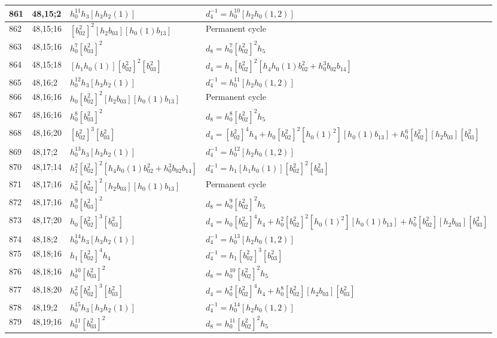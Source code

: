 \documentclass{article}
\begin{document}
\begin{longtable}{|l|l|>{\raggedright\arraybackslash}p{6cm}|>{\raggedright\arraybackslash}p{6cm}|}
\hline
861 & 48,15;2 & $h_0^{11}h_3[h_3h_2(1)]$ & $d_{4}^{-1}=h_0^{10}[h_2h_0(1, 2)]$\\
\hline
862 & 48,15;16 & $[b_{02}^2]^2[h_2b_{03}][h_0(1)b_{13}]$ & Permanent cycle\\
863 & 48,15;16 & $h_0^7[b_{03}^2]^2$ &$d_{8}=h_0^7[b_{02}^2]^2h_5$\\
\hline
864 & 48,15;18 & $[h_1h_0(1)][b_{02}^2]^2[b_{03}^2]$ &$d_{4}=h_1[b_{02}^2]^2[h_4h_0(1)b_{02}^2 + h_0^3b_{02}b_{14}]$\\
\hline
865 & 48,16;2 & $h_0^{12}h_3[h_3h_2(1)]$ & $d_{4}^{-1}=h_0^{11}[h_2h_0(1, 2)]$\\
\hline
866 & 48,16;16 & $h_0[b_{02}^2]^2[h_2b_{03}][h_0(1)b_{13}]$ & Permanent cycle\\
867 & 48,16;16 & $h_0^8[b_{03}^2]^2$ &$d_{8}=h_0^8[b_{02}^2]^2h_5$\\
\hline
868 & 48,16;20 & $[b_{02}^2]^3[b_{03}^2]$ &$d_{4}=[b_{02}^2]^4h_4 + h_0[b_{02}^2]^2[h_0(1)^2][h_0(1)b_{13}] + h_0^6[b_{02}^2][h_2b_{03}][b_{03}^2]$\\
\hline
869 & 48,17;2 & $h_0^{13}h_3[h_3h_2(1)]$ & $d_{4}^{-1}=h_0^{12}[h_2h_0(1, 2)]$\\
\hline
870 & 48,17;14 & $h_1^2[b_{02}^2]^2[h_4h_0(1)b_{02}^2 + h_0^3b_{02}b_{14}]$ & $d_{4}^{-1}=h_1[h_1h_0(1)][b_{02}^2]^2[b_{03}^2]$\\
\hline
871 & 48,17;16 & $h_0^2[b_{02}^2]^2[h_2b_{03}][h_0(1)b_{13}]$ & Permanent cycle\\
872 & 48,17;16 & $h_0^9[b_{03}^2]^2$ &$d_{8}=h_0^9[b_{02}^2]^2h_5$\\
\hline
873 & 48,17;20 & $h_0[b_{02}^2]^3[b_{03}^2]$ &$d_{4}=h_0[b_{02}^2]^4h_4 + h_0^2[b_{02}^2]^2[h_0(1)^2][h_0(1)b_{13}] + h_0^7[b_{02}^2][h_2b_{03}][b_{03}^2]$\\
\hline
874 & 48,18;2 & $h_0^{14}h_3[h_3h_2(1)]$ & $d_{4}^{-1}=h_0^{13}[h_2h_0(1, 2)]$\\
\hline
875 & 48,18;16 & $h_1[b_{02}^2]^4h_4$ & $d_{4}^{-1}=h_1[b_{02}^2]^3[b_{03}^2]$\\
876 & 48,18;16 & $h_0^{10}[b_{03}^2]^2$ &$d_{8}=h_0^{10}[b_{02}^2]^2h_5$\\
\hline
877 & 48,18;20 & $h_0^2[b_{02}^2]^3[b_{03}^2]$ &$d_{4}=h_0^2[b_{02}^2]^4h_4 + h_0^8[b_{02}^2][h_2b_{03}][b_{03}^2]$\\
\hline
878 & 48,19;2 & $h_0^{15}h_3[h_3h_2(1)]$ & $d_{4}^{-1}=h_0^{14}[h_2h_0(1, 2)]$\\
\hline
879 & 48,19;16 & $h_0^{11}[b_{03}^2]^2$ &$d_{8}=h_0^{11}[b_{02}^2]^2h_5$\\

\end{longtable}
\end{document}
